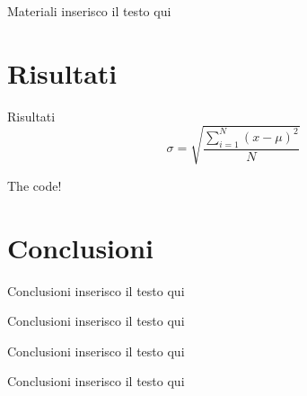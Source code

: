 \documentclass{beamer} %
\begin{document}
        \begin{frame}{Materiali}
            inserisco il testo qui
        \end{frame}

\section{Risultati}

        \begin{frame}{Risultati}
            \begin{equation}
                \sigma =\sqrt{\frac{\displaystyle\sum_{i=1}^{N}{(x - \mu)^2}}{N}}
            \end{equation}
        \end{frame}

        \begin{frame}{The code!}
        \end{frame}

\section{Conclusioni}

        \begin{frame}{Conclusioni}
            inserisco il testo qui
        \end{frame}

        \begin{frame}{Conclusioni}
            inserisco il testo qui
        \end{frame}

        \begin{frame}{Conclusioni}
            inserisco il testo qui
        \end{frame}

        \begin{frame}{Conclusioni}
            inserisco il testo qui
        \end{frame}
\end{document}
